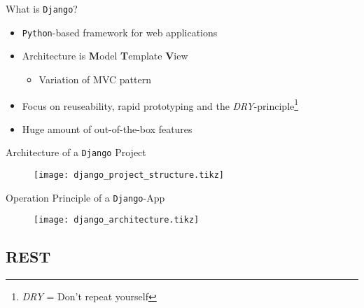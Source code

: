 \documentclass{beamer}
\newcommand{\django}{\texttt{Django}}
\begin{document}
    \begin{frame}{What is \django?}
        \begin{itemize}
            \item \texttt{Python}-based framework for web applications
            \item Architecture is \textbf{M}odel \textbf{T}emplate \textbf{V}iew
	      \begin{itemize}
	       \item  Variation of MVC pattern 
	      \end{itemize}
            \item Focus on reuseability, rapid prototyping and the \emph{DRY}-principle\footnote{\emph{DRY} = Don't repeat yourself}
            \item Huge amount of out-of-the-box features
        \end{itemize}
    \end{frame}



    \begin{frame}[fragile]{Architecture of a \django{} Project}
        \begin{figure}
            \centering
            \texttt{[image: django\_project\_structure.tikz]}
        \end{figure}
    \end{frame}

    \begin{frame}[fragile]{Operation Principle of a \django{}-App}
        \begin{figure}
            \centering
            \texttt{[image: django\_architecture.tikz]}
        \end{figure}
    \end{frame}

\subsection{REST}
\end{document}
